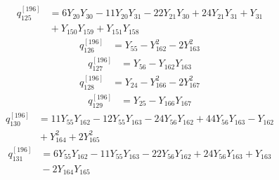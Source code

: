 \begin{equation}\label{q196:row:125}
\begin{aligned}
q_{125}^{[196]} &={} 6Y_{20}Y_{30} - 11Y_{20}Y_{31} - 22Y_{21}Y_{30} + 24Y_{21}Y_{31} + Y_{31}\\
&{} + Y_{150}Y_{159} + Y_{151}Y_{158}
\end{aligned}
\end{equation}
\begin{equation}\label{q196:row:126}
\begin{aligned}
q_{126}^{[196]} &={} Y_{55} - Y_{162}^{2} - 2Y_{163}^{2}
\end{aligned}
\end{equation}
\begin{equation}\label{q196:row:127}
\begin{aligned}
q_{127}^{[196]} &={} Y_{56} - Y_{162}Y_{163}
\end{aligned}
\end{equation}
\begin{equation}\label{q196:row:128}
\begin{aligned}
q_{128}^{[196]} &={} Y_{24} - Y_{166}^{2} - 2Y_{167}^{2}
\end{aligned}
\end{equation}
\begin{equation}\label{q196:row:129}
\begin{aligned}
q_{129}^{[196]} &={} Y_{25} - Y_{166}Y_{167}
\end{aligned}
\end{equation}
\begin{equation}\label{q196:row:130}
\begin{aligned}
q_{130}^{[196]} &={} 11Y_{55}Y_{162} - 12Y_{55}Y_{163} - 24Y_{56}Y_{162} + 44Y_{56}Y_{163} - Y_{162}\\
&{} + Y_{164}^{2} + 2Y_{165}^{2}
\end{aligned}
\end{equation}
\begin{equation}\label{q196:row:131}
\begin{aligned}
q_{131}^{[196]} &={} 6Y_{55}Y_{162} - 11Y_{55}Y_{163} - 22Y_{56}Y_{162} + 24Y_{56}Y_{163} + Y_{163}\\
&{} - 2Y_{164}Y_{165}
\end{aligned}
\end{equation}
